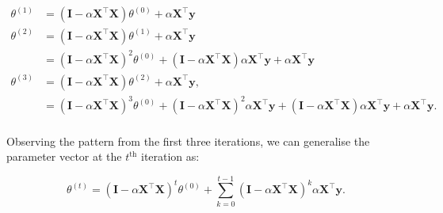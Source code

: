\begin{align*}
    \theta^{(1)} & = (\mathbf{I} - \alpha \boldsymbol{X}^\top \boldsymbol{X}) \theta^{(0)} + \alpha \boldsymbol{X}^\top \boldsymbol{y}                                                                                                                                                                                                               \\
    \theta^{(2)} & = (\mathbf{I} - \alpha \boldsymbol{X}^\top \boldsymbol{X}) \theta^{(1)} + \alpha \boldsymbol{X}^\top \boldsymbol{y}                                                                                                                                                                                                               \\
                 & = (\mathbf{I} - \alpha \boldsymbol{X}^\top \boldsymbol{X})^2 \theta^{(0)} + (\mathbf{I} - \alpha \boldsymbol{X}^\top \boldsymbol{X})\alpha \boldsymbol{X}^\top \boldsymbol{y}                 +
    \alpha \boldsymbol{X}^\top \boldsymbol{y}                                                                                                                                                                                                                                                                                                        \\
    \theta^{(3)} & = (\mathbf{I} - \alpha \boldsymbol{X}^\top \boldsymbol{X}) \theta^{(2)} + \alpha \boldsymbol{X}^\top \boldsymbol{y},                                                                                                                                                                                                              \\
                 & = (\mathbf{I} - \alpha \boldsymbol{X}^\top \boldsymbol{X})^3 \theta^{(0)} + (\mathbf{I} - \alpha \boldsymbol{X}^\top \boldsymbol{X})^2 \alpha \boldsymbol{X}^\top \boldsymbol{y} + (\mathbf{I} - \alpha \boldsymbol{X}^\top \boldsymbol{X})\alpha \boldsymbol{X}^\top \boldsymbol{y} + \alpha \boldsymbol{X}^\top \boldsymbol{y}.
    \\
\end{align*}

Observing the pattern from the first three iterations, we can generalise the parameter vector at the \(t^{\text{th}}\) iteration as:

\[
    \theta^{(t)} = (\mathbf{I} - \alpha \boldsymbol{X}^\top \boldsymbol{X})^t \theta^{(0)} + \sum_{k=0}^{t-1} (\mathbf{I} - \alpha \boldsymbol{X}^\top \boldsymbol{X})^k \alpha \boldsymbol{X}^\top \boldsymbol{y}.
\]

